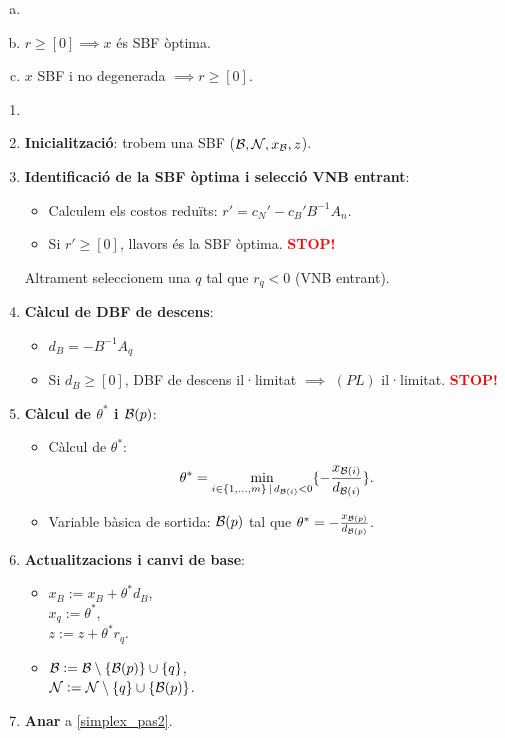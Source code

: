 \begin{teo*}
    \begin{enumerate}[a)]
        \item[]
        \item $r \geq [0] \implies x$ és SBF òptima.
        \item $x$ SBF i no degenerada $\implies r \geq [0]$.
    \end{enumerate}
\end{teo*}
\begin{alg}
    \begin{enumerate}
        \item[]
        \item {\bf Inicialització}: trobem una SBF ($\mathcal{B}, \mathcal{N}, x_{\mathcal{B}}, z$).
        \item \label{simplex_pas2} {\bf Identificació de la SBF òptima i selecció VNB entrant}:
            \begin{itemize}
                \item Calculem els costos reduïts: $r' = c_N' - c_B'B^{-1}A_n$.
                \item Si $r' \geq [0]$, llavors és la SBF òptima. \textcolor{red}{\bf STOP!}
            \end{itemize}
            Altrament seleccionem una $q$ tal que $r_q < 0$ (VNB entrant).
        \item {\bf Càlcul de DBF de descens}:
            \begin{itemize}
                \item $d_B = -B^{-1}A_q$
                \item Si $d_B \geq [0]$, DBF de descens il·limitat $\implies$ $(PL)$ il·limitat. \textcolor{red}{\bf STOP!}
            \end{itemize}
        \item {\bf Càlcul de $\theta^*$ i $\mathcal{B}(p)$}:
            \begin{itemize}
                \item Càlcul de $\theta^*$: 
                    \[\theta^* = \min_{i \in \{ 1, \dots, m \} \,|\, d_{\mathcal{B}(i)} < 0} \{-\frac{x_{\mathcal{B}(i)}}{d_{\mathcal{B}(i)}} \}.\]
                \item Variable bàsica de sortida: $\mathcal{B}(p)$ tal que $\theta^* = -\frac{x_{\mathcal{B}(p)}}{d_{\mathcal{B}(p)}}$.
            \end{itemize}
        \item {\bf Actualitzacions i canvi de base}:
            \begin{itemize}
                \item $x_B := x_B + \theta^*d_B$, \\
                    $x_q := \theta^*$, \\
                    $z := z + \theta^* r_q$.
                \item $\mathcal{B} := \mathcal{B} \setminus \{\mathcal{B}(p)\} \cup \{q\}$, \\
                    $\mathcal{N} := \mathcal{N} \setminus \{q\} \cup \{\mathcal{B}(p)\}$.
            \end{itemize}
        \item {\bf Anar} a \ref{simplex_pas2}.
    \end{enumerate}
\end{alg}
